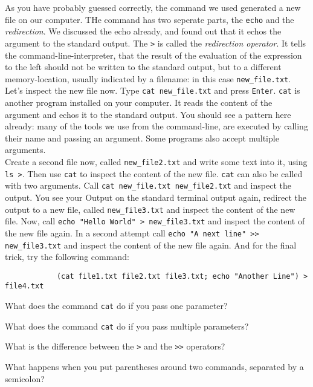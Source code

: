 \begin{challenge}
    \begin{task}
        As you have probably guessed correctly, the command we used generated a new file on our computer.
        THe command has two seperate parts, the \texttt{echo} and the \textit{redirection}.
        We discussed the echo already, and found out that it echos the argument to the standard output.
        The \texttt{>} is called the \textit{redirection operator}.
        It tells the command-line-interpreter, that the result of the evaluation of the expression to the left should not be written to the standard output, but to a different memory-location, usually indicated by a filename: in this case \texttt{new_file.txt}.
        Let's inspect the new file now.
        Type \texttt{cat new_file.txt} and press \texttt{Enter}.
        \texttt{cat} is another program installed on your computer.
        It reads the content of the argument and echos it to the standard output.
        You should see a pattern here already: many of the tools we use from the command-line, are executed by calling their name and passing an argument.
        Some programs also accept multiple arguments.\\
        Create a second file now, called \texttt{new_file2.txt} and write some text into it, using \texttt{ls >}.
        Then use \texttt{cat} to inspect the content of the new file.
        \texttt{cat} can also be called with two arguments. 
        Call \texttt{cat new_file.txt new_file2.txt} and inspect the output.
        You see your Output on the standard terminal output again, redirect the output to a new file, called \texttt{new_file3.txt} and inspect the content of the new file.
        Now, call \texttt{echo "Hello World" > new_file3.txt} and inspect the content of the new file again.
        In a second attempt call \texttt{echo "A next line" >> new_file3.txt} and inspect the content of the new file again.
        And for the final trick, try the following command:
        \begin{lstlisting}
            (cat file1.txt file2.txt file3.txt; echo "Another Line") > file4.txt
        \end{lstlisting}
        \begin{questions}
            \item What does the command \texttt{cat} do if you pass one parameter?
            \item What does the command \texttt{cat} do if you pass multiple parameters?
            \item What is the difference between the \texttt{>} and the \texttt{>>} operators?
            \item What happens when you put parentheses around two commands, separated by a semicolon?
        \end{questions}
    \end{task}



\end{challenge}
